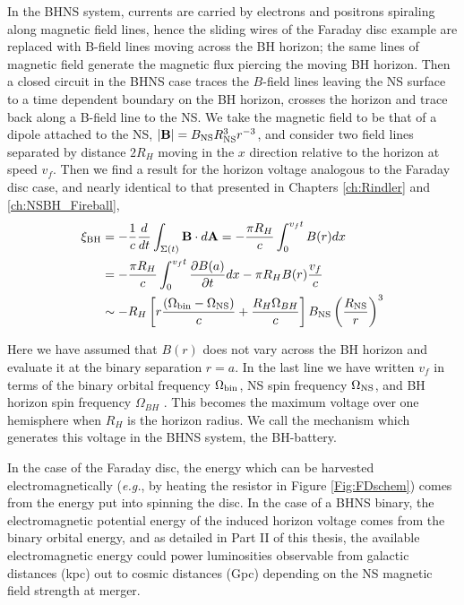 In the BHNS system, currents are carried by electrons and positrons spiraling
along magnetic field lines, hence the sliding wires of the Faraday disc
example are replaced with B-field lines moving across the BH horizon; the same
lines of magnetic field generate the magnetic flux piercing the moving BH
horizon. Then a closed circuit in the BHNS case traces the $B$-field lines
leaving the NS surface to a time dependent boundary on the BH horizon, crosses
the horizon and trace back along a B-field line to the NS. We take the magnetic field
to be that of a dipole attached to the NS, $|{\bf B}| = B_{\rm NS} R^3_{\rm NS}
r^{-3}$, and consider two field lines separated by distance $2R_H$ moving in the
$x$ direction relative to the horizon at speed $v_f$. Then we find a result
for the horizon voltage analogous to the Faraday disc case, and nearly
identical to that presented in Chapters \ref{ch:Rindler} and \ref{ch:NSBH_Fireball},
\begin{align}
\xi_{\rm BH} &= - \frac{1}{c}\frac{d}{dt} \int_{\Sigma(t)}{{\bf B} \cdot d{\bf A}} =  - \frac{\pi R_H}{c} \int^{v_f t}_{0} {B(r) dx}  \\
&=  - \frac{\pi R_H}{c}  \int^{v_f t}_{0}{ \frac{\partial B(a)}{\partial t} dx}  - \pi R_H B(r) \frac{v_f}{c}    \\
& \sim    -R_H \left[r \frac{\left(\Omega_{\rm bin}  - \Omega_{\rm NS}\right)}{c} + \frac{R_H\Omega_{BH}}{c}\right] B_{\rm NS}  \left( \frac{R_{\rm NS}}{r} \right)^3
\end{align}

Here we have assumed that $B(r)$ does not vary across the BH horizon and
evaluate it at the binary separation $r=a$. In the last line we have written
$v_f$ in terms of the binary orbital frequency $\Omega_{\rm bin}$, NS spin
frequency $\Omega_{\rm NS}$, and BH horizon spin frequency $\Omega_{BH}$
\citep[see][]{McL:2011}. This becomes the maximum voltage over one hemisphere
when $R_H$ is the horizon radius. We call the mechanism which generates this voltage in the BHNS system, the BH-battery.

In the case of the Faraday disc, the energy which can be harvested
electromagnetically (\textit{e.g.}, by heating the resistor in Figure
\ref{Fig:FDschem}) comes from the energy put into spinning
the disc. In the case of a BHNS binary, the electromagnetic potential energy
of the induced horizon voltage comes from the binary orbital energy, and as
detailed in Part II of this thesis, the available electromagnetic energy could
power luminosities observable from galactic distances (kpc) out to cosmic
distances (Gpc) depending on the NS magnetic field strength at merger.


